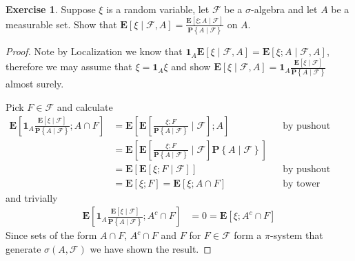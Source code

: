 \documentclass{amsbook}
\theoremstyle{definition}
\newtheorem{xca}{Exercise}
\theoremstyle{remark}
\newcommand{\expectation}[1]{\textbf{E}\left[#1\right]}
\newcommand{\cexpectationlong}[2]{\textbf{E}\left[ #2 \mid #1 \right]}
\newcommand{\cprobability}[2]{\textbf{P} \left \{#2 \mid #1 \right \}}
\newcommand{\characteristic}[1]{\textbf{1}_{#1}}
\begin{document}
\begin{xca}Suppose $\xi$ is a random variable, let $\mathcal{F}$ be
  a $\sigma$-algebra and let $A$ be a measurable set.  Show that
  $\cexpectationlong{\mathcal{F},A}{\xi} =
  \frac{\cexpectationlong{\mathcal{F}}{\xi ;
      A}}{\cprobability{\mathcal{F}}{A}}$ on $A$.
\end{xca}
\begin{proof}
Note by Localization we know that $\characteristic{A}
\cexpectationlong{\mathcal{F},A}{\xi}  =
\cexpectationlong{\mathcal{F},A}{\xi;A}$, therefore we may assume that
$\xi = \characteristic{A} \xi$ and show
$\cexpectationlong{\mathcal{F},A}{\xi} = \characteristic{A}\frac{\cexpectationlong{\mathcal{F}}{\xi}}{\cprobability{\mathcal{F}}{A}}$ almost surely.

Pick $F \in \mathcal{F}$ and calculate
\begin{align*}
\expectation{\characteristic{A} \frac{\cexpectationlong{\mathcal{F}}
{\xi}}
{\cprobability{\mathcal{F}}{A}}
; A \cap F} 
&= \expectation{\cexpectationlong{\mathcal{F}}{\frac{\xi ; F}
{\cprobability{\mathcal{F}}{A}}} 
; A } & & \text{by pushout}\\
&= \expectation{\cexpectationlong{\mathcal{F}}{\frac{\xi ; F}
{\cprobability{\mathcal{F}}{A}}} 
\cprobability{\mathcal{F}}{A} } \\
&= \expectation{\cexpectationlong{\mathcal{F}}{\xi ; F}} & & \text{by
  pushout} \\
&= \expectation{\xi ; F} = 
\expectation{\xi ; A \cap F} & & \text{by tower property}
\end{align*}
and trivially
\begin{align*}
\expectation{\characteristic{A} \frac{\cexpectationlong{\mathcal{F}}
{\xi}}
{\cprobability{\mathcal{F}}{A}}
; A^c \cap F}  &= 0 = \expectation{\xi ; A^c \cap F}
\end{align*}
Since sets of the form $A \cap F$, $A^c \cap F$ and $F$ for $F \in
\mathcal{F}$ form a $\pi$-system that generate $\sigma(A,
\mathcal{F})$ we have shown the result.
\end{proof}
\end{document}
